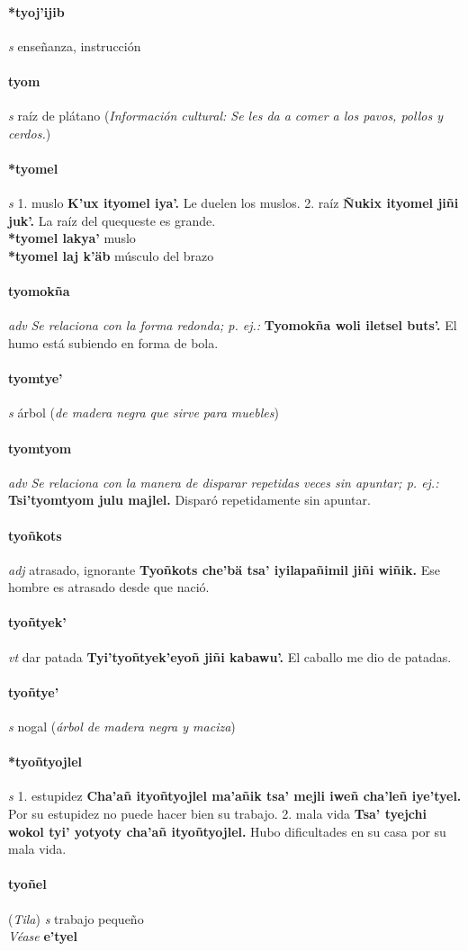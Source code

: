 \documentclass{scrbook}
\newcommand{\entry}[1]{\paragraph{#1}}
\newcommand{\onedefinition}[1]{#1.}
\newcommand{\nontranslationdef}[1]{\textit{#1}}
\newcommand{\partofspeech}[1]{\textit{#1}}
\newcommand{\spanishtranslation}[1]{#1}
\newcommand{\clarification}[1]{(\textit{#1})}
\newcommand{\cholexample}[1]{\textbf{#1}}
\newcommand{\exampletranslation}[1]{#1}
\newcommand{\alsosee}[1]{\\\textit{Véase} \textbf{#1}}
\newcommand{\relevantdialect}[1]{(\textit{#1})}
\newcommand{\culturalinformation}[1]{(\textit{#1})}
\newcommand{\secondaryentry}[1]{\\\textbf{#1}}
\newcommand{\secondtranslation}[1]{#1}
\begin{document}
\begin{multicols}{2}
\entry{*tyoj'ijib}
\partofspeech{s}
\spanishtranslation{enseñanza, instrucción}

\entry{tyom}
\partofspeech{s}
\spanishtranslation{raíz de plátano}
\culturalinformation{Información cultural: Se les da a comer a los pavos, pollos y cerdos.}

\entry{*tyomel}
\partofspeech{s}
\onedefinition{1}
\spanishtranslation{muslo}
\cholexample{K'ux ityomel iya'.}
\exampletranslation{Le duelen los muslos.}
\onedefinition{2}
\spanishtranslation{raíz}
\cholexample{Ñukix ityomel jiñi juk'.}
\exampletranslation{La raíz del quequeste es grande.}
\secondaryentry{*tyomel lakya'}
\secondtranslation{muslo}
\secondaryentry{*tyomel laj k'äb}
\secondtranslation{músculo del brazo}

\entry{tyomokña}
\partofspeech{adv}
\nontranslationdef{Se relaciona con la forma redonda; p. ej.:}
\cholexample{Tyomokña woli iletsel buts'.}
\exampletranslation{El humo está subiendo en forma de bola.}

\entry{tyomtye'}
\partofspeech{s}
\spanishtranslation{árbol}
\clarification{de madera negra que sirve para muebles}

\entry{tyomtyom}
\partofspeech{adv}
\nontranslationdef{Se relaciona con la manera de disparar repetidas veces sin apuntar; p. ej.:}
\cholexample{Tsi'tyomtyom julu majlel.}
\exampletranslation{Disparó repetidamente sin apuntar.}

\entry{tyoñkots}
\partofspeech{adj}
\spanishtranslation{atrasado, ignorante}
\cholexample{Tyoñkots che'bä tsa' iyilapañimil jiñi wiñik.}
\exampletranslation{Ese hombre es atrasado desde que nació.}

\entry{tyoñtyek'}
\partofspeech{vt}
\spanishtranslation{dar patada}
\cholexample{Tyi'tyoñtyek'eyoñ jiñi kabawu'.}
\exampletranslation{El caballo me dio de patadas.}

\entry{tyoñtye'}
\partofspeech{s}
\spanishtranslation{nogal}
\clarification{árbol de madera negra y maciza}

\entry{*tyoñtyojlel}
\partofspeech{s}
\onedefinition{1}
\spanishtranslation{estupidez}
\cholexample{Cha'añ ityoñtyojlel ma'añik tsa' mejli iweñ cha'leñ iye'tyel.}
\exampletranslation{Por su estupidez no puede hacer bien su trabajo.}
\onedefinition{2}
\spanishtranslation{mala vida}
\cholexample{Tsa' tyejchi wokol tyi' yotyoty cha'añ ityoñtyojlel.}
\exampletranslation{Hubo dificultades en su casa por su mala vida.}

\entry{tyoñel}
\relevantdialect{Tila}
\partofspeech{s}
\spanishtranslation{trabajo pequeño}
\alsosee{e'tyel}


\end{multicols}
\end{document}
